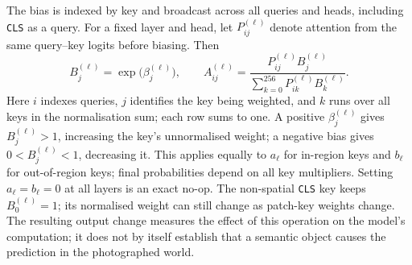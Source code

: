 The bias is indexed by key and broadcast across all queries and heads,
including \texttt{CLS} as a query.
For a fixed layer and head, let $P_{ij}^{(\ell)}$ denote attention from
the same query--key logits before biasing. Then
\begin{equation}
  B_j^{(\ell)}=\exp\!\bigl(\beta_j^{(\ell)}\bigr),
  \qquad
  A_{ij}^{(\ell)}=
  \frac{P_{ij}^{(\ell)}B_j^{(\ell)}}
       {\sum_{k=0}^{256}P_{ik}^{(\ell)}B_k^{(\ell)}}.
  \label{eq:reweighting}
\end{equation}
Here $i$ indexes queries, $j$ identifies the key being weighted, and $k$
runs over all keys in the normalisation sum; each row sums to one.
A positive $\beta_j^{(\ell)}$ gives $B_j^{(\ell)}>1$, increasing the key's
unnormalised weight; a negative bias gives $0<B_j^{(\ell)}<1$, decreasing it.
This applies equally to $a_\ell$ for in-region keys and $b_\ell$ for
out-of-region keys; final probabilities depend on all key multipliers.
Setting $a_\ell=b_\ell=0$ at all layers is an exact no-op. The non-spatial
\texttt{CLS} key keeps $B_0^{(\ell)}=1$; its normalised weight can still
change as patch-key weights change.
The resulting output change measures the effect of this operation on the
model's computation; it does not by itself establish that a semantic object
causes the prediction in the photographed world.

